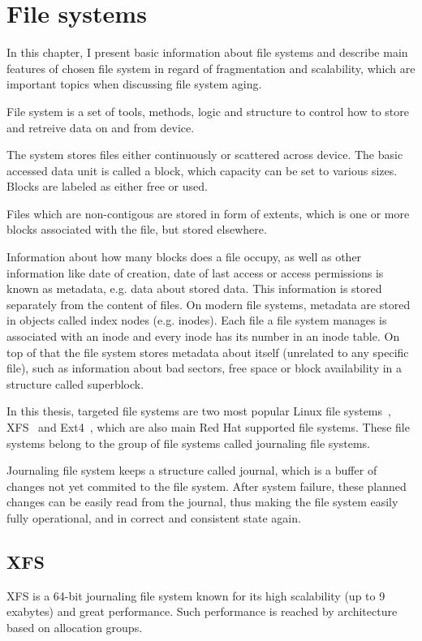 \documentclass[
  color, %
  table, %
  lof,   %
  lot,   %
]{fithesis3}
\begin{document}


\chapter{File systems}
In this chapter, I present basic information about file systems and describe main features of chosen file system in regard of fragmentation and scalability, which are important topics when discussing file system aging.

File system is a set of tools, methods, logic and structure to control how to store and retreive data on and from device.

The system stores files either continuously or scattered across device. The basic accessed data unit is called a block, which capacity can be set to various sizes. Blocks are labeled as either free or used.

Files which are non-contigous are stored in form of extents, which is one or more blocks associated with the file, but stored elsewhere.  

Information about how many blocks does a file occupy, as well as other information like date of creation, date of last access or access permissions is known as metadata, e.g. data about stored data. This information is stored separately from the content of files. On modern file systems, metadata are stored in objects called index nodes (e.g. inodes). Each file a file system manages is associated with an inode and every inode has its number in an inode table. On top of that the file system stores metadata about itself (unrelated to any specific file), such as information about bad sectors, free space or block availability in a structure called superblock.

In this thesis, targeted file systems are two most popular Linux file systems~\cite{Lu:2013:SLF:2591272.2591276}, XFS~\cite{xfs:qhe} and Ext4~\cite{ext4:qhe}, which are also main Red Hat supported file systems. These file systems belong to the group of file systems called journaling file systems.

Journaling file system keeps a structure called journal, which is a buffer of changes not yet commited to the file system. After system failure, these planned changes can be easily read from the journal, thus making the file system easily fully operational, and in correct and consistent state again.

\section{XFS}
XFS is a 64-bit journaling file system known for its high scalability (up to 9 exabytes) and great performance. Such performance is reached by architecture based on allocation groups.
\end{document}
